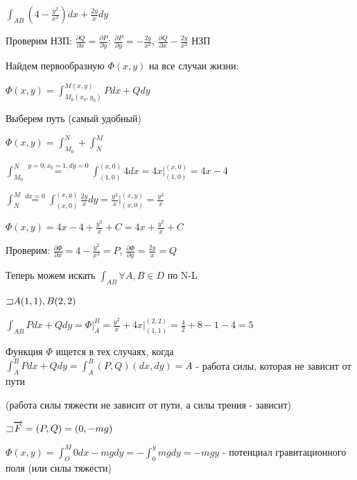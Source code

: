 \documentclass[12pt]{article}
\begin{document}
    \Ex $\int_{AB} (4 - \frac{y^2}{x^2})dx + \frac{2y}{x}dy$

    Проверим НЗП: $\frac{\partial Q}{\partial x} = \frac{\partial P}{\partial y}$: $\frac{\partial P}{\partial y} = -\frac{2y}{x^2}$, $\frac{\partial Q}{\partial x} -\frac{2y}{x^2}$ \Longleftrightarrow НЗП

    Найдем первообразную $\Phi(x, y)$ на все случаи жизни:

    $\Phi(x, y) = \int_{M_0(x_0, y_0)}^{M(x, y)} Pdx + Qdy$

    Выберем путь (самый удобный)

    $\Phi(x, y) = \int_{M_0}^{N} + \int_{N}^{M}$

    $\int_{M_0}^{N} \stackrel{y = 0, x_0 = 1, dy = 0}{=} \int_{(1, 0)}^{(x, 0)} 4 dx = 4x \Big|_{(1,0)}^{(x,0)} = 4x - 4$

    $\int_{N}^{M} \stackrel{dx = 0}{=} \int_{(x, 0)}^{(x, y)} \frac{2y}{x} dy = \frac{y^2}{x} \Big|_{(x,0)}^{(x,y)} = \frac{y^2}{x}$

    $\Phi(x, y) = 4x - 4 + \frac{y^2}{x} + C = 4x + \frac{y^2}{x} + C$

    Проверим: $\frac{\partial \Phi}{\partial x} = 4 - \frac{y^2}{x^2} = P$, $\frac{\partial \Phi}{\partial y} = \frac{2y}{x} = Q$

    Теперь можем искать $\int_{AB} \forall A, B \in D$ по N-L

    $\mathord{\sqsupset} A(1, 1), B(2, 2)$

    $\int_{AB} Pdx + Qdy = \Phi \Big|_A^B = \frac{y^2}{x} + 4x \Big|_{(1,1)}^{(2,2)} = \frac{4}{2} + 8 - 1 - 4 = 5$

    \Nota Функция $\Phi$ ищется в тех случаях, когда $\int_A^B Pdx + Qdy = \int^B_A (P, Q) (dx, dy) = A$ - работа силы, которая не зависит от пути

    (\Exs работа силы тяжести не зависит от пути, а силы трения - зависит)

    \Ex $\mathord{\sqsupset} \overrightarrow{F} = (P, Q) = (0, -mg)$

    $\Phi(x, y) = \int_O^M 0dx - mgdy = -\int_0^y mgdy = -mgy$ - потенциал гравитационного поля (или силы тяжести)
\end{document}

